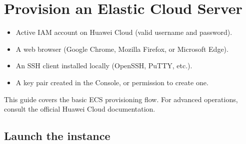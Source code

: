 \documentclass[english]{guide}
\begin{document}
\makecover

\sumario

\startbody

\section{Provision an Elastic Cloud Server}

\begin{objetivos}

  \prerequisitos
  \begin{itemize}
    \item Active IAM account on Huawei Cloud (valid username and password).
    \item A web browser (Google Chrome, Mozilla Firefox, or Microsoft Edge).
    \item An SSH client installed locally (OpenSSH, PuTTY, etc.).
    \item A key pair created in the Console, or permission to create one.
  \end{itemize}
\end{objetivos}

\begin{infobox}
This guide covers the basic ECS provisioning flow. For advanced operations,
consult the official Huawei Cloud documentation.
\end{infobox}

\subsection{Launch the instance}

\end{document}
